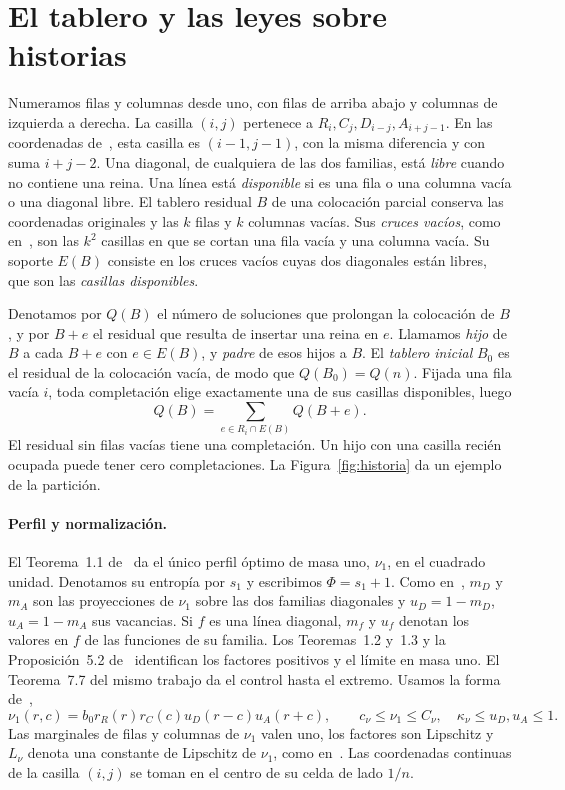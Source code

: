 \section{El tablero y las leyes sobre historias}\label{leyes}
\begin{definicion}
Numeramos filas y columnas desde uno, con filas de arriba abajo y columnas de izquierda a
derecha. La casilla $(i,j)$ pertenece a $R_i,C_j,D_{i-j},A_{i+j-1}$. En las coordenadas
de~\cite{perfil,ultimas}, esta casilla es $(i-1,j-1)$, con la misma diferencia y con suma
$i+j-2$. Una diagonal, de cualquiera de las dos familias, está \emph{libre} cuando no contiene una
reina. Una línea está \emph{disponible} si es una fila o una columna vacía o una diagonal libre. El
tablero residual $B$ de una colocación parcial conserva las coordenadas originales y las $k$ filas y
$k$ columnas vacías. Sus \emph{cruces vacíos}, como en~\cite{ultimas}, son las $k^2$ casillas en que se
cortan una fila vacía y una columna vacía. Su soporte $E(B)$ consiste en los cruces vacíos cuyas dos
diagonales están libres, que son las \emph{casillas disponibles}.
\end{definicion}
Denotamos por $Q(B)$ el número de soluciones que prolongan la colocación de $B$, y por
$B+e$ el residual que resulta de insertar una reina en $e$. Llamamos \emph{hijo} de $B$ a cada $B+e$
con $e\in E(B)$, y \emph{padre} de esos hijos a $B$. El \emph{tablero inicial} $B_0$ es el residual
de la colocación vacía, de modo que $Q(B_0)=Q(n)$. Fijada una fila vacía $i$, toda completación
elige exactamente una de sus casillas disponibles, luego
\begin{equation}\label{particion}
 Q(B)=\sum_{e\in R_i\cap E(B)}Q(B+e).
\end{equation}
El residual sin filas vacías tiene una completación. Un hijo con una casilla recién ocupada
puede tener cero completaciones. La Figura~\ref{fig:historia} da un ejemplo de la partición.


\paragraph{Perfil y normalización.}
El Teorema~1.1 de~\cite{perfil} da el único perfil óptimo de masa uno, $\nu_1$, en el
cuadrado unidad. Denotamos su entropía por $s_1$ y escribimos $\Phi=s_1+1$. Como
en~\cite{perfil,ultimas,pred}, $m_D$ y $m_A$ son las proyecciones de $\nu_1$ sobre las dos familias
diagonales y $u_D=1-m_D$, $u_A=1-m_A$ sus vacancias. Si $f$ es una línea diagonal, $m_f$ y $u_f$
denotan los valores en $f$ de las funciones de su familia. Los Teoremas~1.2 y~1.3 y la Proposición~5.2
de~\cite{perfil} identifican los factores positivos y el límite en masa uno. El Teorema~7.7 del mismo
trabajo da el control hasta el extremo. Usamos la forma de~\cite[Sección~2]{pred},
\[
 \nu_1(r,c)=b_0 r_R(r)r_C(c)u_D(r-c)u_A(r+c),\qquad
 c_\nu\le\nu_1\le C_\nu,\quad \kappa_\nu\le u_D,u_A\le1.
\]
Las marginales de filas y columnas de $\nu_1$ valen uno, los factores son Lipschitz y $L_\nu$ denota
una constante de Lipschitz de $\nu_1$, como en~\cite{pred}. Las coordenadas continuas de la casilla
$(i,j)$ se toman en el centro de su celda de lado $1/n$.

